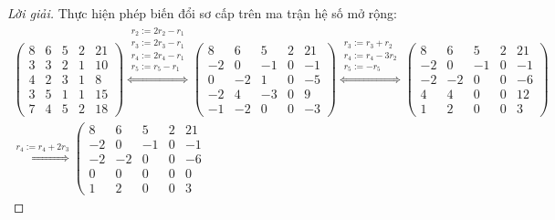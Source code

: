 \documentclass[class=linear-algebra,crop=false]{standalone}
\begin{document}
\begin{proof}[Lời giải]
	\par Thực hiện phép biến đổi sơ cấp trên ma trận hệ số mở rộng:
	\begingroup{}
	\allowdisplaybreaks{}
	\begin{gather*}
		\left(
		\begin{array}{cccc|c}
				8 & 6 & 5 & 2 & 21 \\
				3 & 3 & 2 & 1 & 10 \\
				4 & 2 & 3 & 1 & 8  \\
				3 & 5 & 1 & 1 & 15 \\
				7 & 4 & 5 & 2 & 18
			\end{array}
		\right)
		\stackrel{
			\substack{
				r_{2}:= 2r_{2} {-} r_{1} \\
				r_{3}:= 2r_{3} {-} r_{1} \\
				r_{4}:= 2r_{4} {-} r_{1} \\
				r_{5}:= r_{5} {-} r_{1}
			}
		}{\Longleftrightarrow}
		\left(\begin{array}{cccc|c}
				8  & 6  & 5  & 2 & 21 \\
				-2 & 0  & -1 & 0 & -1 \\
				0  & -2 & 1  & 0 & -5 \\
				-2 & 4  & -3 & 0 & 9  \\
				-1 & -2 & 0  & 0 & -3
			\end{array}
		\right)
		\stackrel{
		\substack{
		r_{3}:= r_{3} + r_{2} \\
		r_{4}:= r_{4} {-} 3r_{2} \\
		r_{5}:= -r_{5}
		}
		}{\Longleftrightarrow}
		\left(\begin{array}{cccc|c}
				8  & 6  & 5  & 2 & 21 \\
				-2 & 0  & -1 & 0 & -1 \\
				-2 & -2 & 0  & 0 & -6 \\
				4  & 4  & 0  & 0 & 12 \\
				1  & 2  & 0  & 0 & 3
			\end{array}
		\right) \\
		\stackrel{
			r_{4}:= r_{4} + 2r_{3}
		}{\Longleftrightarrow}
		\left(\begin{array}{cccc|c}
				8  & 6  & 5  & 2 & 21 \\
				-2 & 0  & -1 & 0 & -1 \\
				-2 & -2 & 0  & 0 & -6 \\
				0  & 0  & 0  & 0 & 0  \\
				1  & 2  & 0  & 0 & 3
			\end{array}

\end{gather*}
\end{proof}
\end{document}
